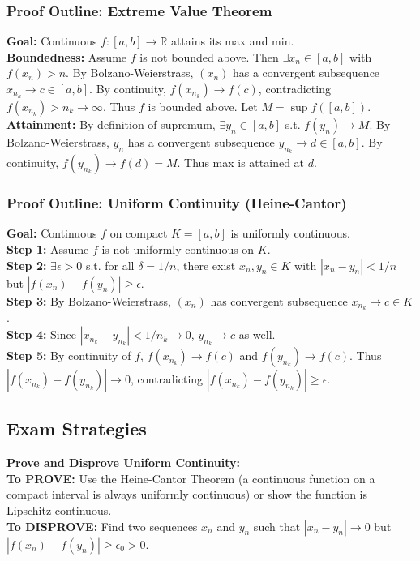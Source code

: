 \subsubsection{Proof Outline: Extreme Value Theorem}
\textbf{Goal:} Continuous $f: [a,b] \to \mathbb{R}$ attains its max and min. \\
\textbf{Boundedness:} Assume $f$ is not bounded above. Then $\exists x_n \in [a,b]$ with $f(x_n) > n$. By Bolzano-Weierstrass, $(x_n)$ has a convergent subsequence $x_{n_k} \to c \in [a,b]$. By continuity, $f(x_{n_k}) \to f(c)$, contradicting $f(x_{n_k}) > n_k \to \infty$. Thus $f$ is bounded above. Let $M = \sup f([a,b])$. \\
\textbf{Attainment:} By definition of supremum, $\exists y_n \in [a,b]$ s.t. $f(y_n) \to M$. By Bolzano-Weierstrass, $y_n$ has a convergent subsequence $y_{n_k} \to d \in [a,b]$. By continuity, $f(y_{n_k}) \to f(d) = M$. Thus max is attained at $d$.

\subsubsection{Proof Outline: Uniform Continuity (Heine-Cantor)}
\textbf{Goal:} Continuous $f$ on compact $K = [a,b]$ is uniformly continuous. \\
\textbf{Step 1:} Assume $f$ is not uniformly continuous on $K$. \\
\textbf{Step 2:} $\exists \epsilon > 0$ s.t. for all $\delta = 1/n$, there exist $x_n, y_n \in K$ with $|x_n - y_n| < 1/n$ but $|f(x_n) - f(y_n)| \ge \epsilon$. \\
\textbf{Step 3:} By Bolzano-Weierstrass, $(x_n)$ has convergent subsequence $x_{n_k} \to c \in K$. \\
\textbf{Step 4:} Since $|x_{n_k} - y_{n_k}| < 1/n_k \to 0$, $y_{n_k} \to c$ as well. \\
\textbf{Step 5:} By continuity of $f$, $f(x_{n_k}) \to f(c)$ and $f(y_{n_k}) \to f(c)$. Thus $|f(x_{n_k}) - f(y_{n_k})| \to 0$, contradicting $|f(x_{n_k}) - f(y_{n_k})| \ge \epsilon$.

\subsection{Exam Strategies}

\textbf{Prove and Disprove Uniform Continuity:} \\
\textbf{To PROVE:} Use the Heine-Cantor Theorem (a continuous function on a compact interval is always uniformly continuous) or show the function is Lipschitz continuous. \\
\textbf{To DISPROVE:} Find two sequences $x_n$ and $y_n$ such that $|x_n - y_n| \to 0$ but $|f(x_n) - f(y_n)| \ge \epsilon_0 > 0$.
